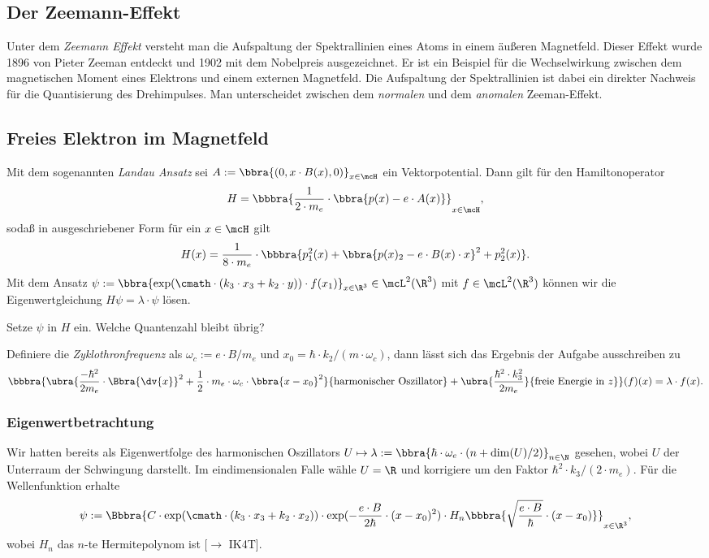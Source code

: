 \documentclass{subfiles}
\begin{document}

    \subsection{Der Zeemann-Effekt}
        Unter dem \emph{Zeemann Effekt} versteht man die Aufspaltung der Spektrallinien eines Atoms in einem äußeren Magnetfeld. Dieser Effekt wurde 1896 von Pieter Zeeman entdeckt und 1902 mit dem Nobelpreis ausgezeichnet. Er ist ein Beispiel für die Wechselwirkung zwischen dem magnetischen Moment eines Elektrons und einem externen Magnetfeld. Die Aufspaltung der Spektrallinien ist dabei ein direkter Nachweis für die Quantisierung des Drehimpulses. Man unterscheidet zwischen dem \emph{normalen} und dem \emph{anomalen} Zeeman-Effekt. 

    \subsection{Freies Elektron im Magnetfeld}

        Mit dem sogenannten \emph{Landau Ansatz} sei $A:=\bbra{(0,x\cdot B(x),0)}_{x\in\mcH}$ ein Vektorpotential. Dann gilt für den Hamiltonoperator 
        \[
            H = \bbbra{\frac{1}{2\cdot m_e}\cdot\bbra{p(x) - e\cdot A(x)}}_{x\in\mcH},
        \]
        sodaß in ausgeschriebener Form für ein $x\in\mcH$ gilt
        \[
            H(x) = \frac{1}{8\cdot m_e}\cdot \bbbra{p_1^2(x) + \bbra{p(x)_2 - e\cdot B(x)\cdot x}^2 + p_2^2(x)}.
        \]
        Mit dem Ansatz $\psi:=\bbra{\exp(\cmath\cdot (k_3\cdot x_3 + k_2\cdot y))\cdot f(x_1)}_{x\in\R^3}\in\mcL^2(\R^3)$ mit $f\in\mcL^2(\R^3)$ können wir die Eigenwertgleichung $H\psi = \lambda\cdot\psi$ lösen.
        \begin{Aufgabe}
            \nr{} Setze $\psi$ in $H$ ein. Welche Quantenzahl bleibt übrig?
        \end{Aufgabe}
        Definiere die \emph{Zyklothronfrequenz} als $\omega_c:=e\cdot B/m_e$ und $x_0 = \hbar\cdot k_2/(m\cdot\omega_c)$, dann lässt sich das Ergebnis der Aufgabe ausschreiben zu 
        \[
            \bbbra{\ubra{\frac{-\hbar^2}{2m_e}\cdot \Bbra{\dv{x}}^2 + \frac{1}{2}\cdot m_e\cdot\omega_c\cdot\bbra{x-x_0}^2}{\text{harmonischer Oszillator}} + \ubra{\frac{\hbar^2\cdot k_3^2}{2m_e}}{\text{freie Energie in }z}}(f)(x) = \lambda\cdot f(x).
        \] 
        \subsubsection*{Eigenwertbetrachtung}
            Wir hatten bereits als Eigenwertfolge des harmonischen Oszillators $U\mapsto \lambda:=\bbra{\hbar\cdot\omega_e\cdot (n+\dim(U)/2)}_{n\in\N}$ gesehen, wobei $U$ der Unterraum der Schwingung darstellt. Im eindimensionalen Falle wähle $U = \R$ und korrigiere um den Faktor $\hbar^2\cdot k_3/(2\cdot m_e)$. Für die Wellenfunktion erhalte
            \[
                \psi := \Bbbra{C\cdot\exp(\cmath\cdot (k_3\cdot x_3 + k_2\cdot x_2))\cdot\exp(-\frac{e\cdot B}{2\hbar}\cdot (x-x_0)^2)\cdot H_n\bbbra{\sqrt{\frac{e\cdot B}{\hbar}}\cdot (x-x_0)}}_{x\in\R^3},
            \]
            wobei $H_n$ das $n$-te Hermitepolynom ist [$\to$ IK4T]. 
\end{document}
